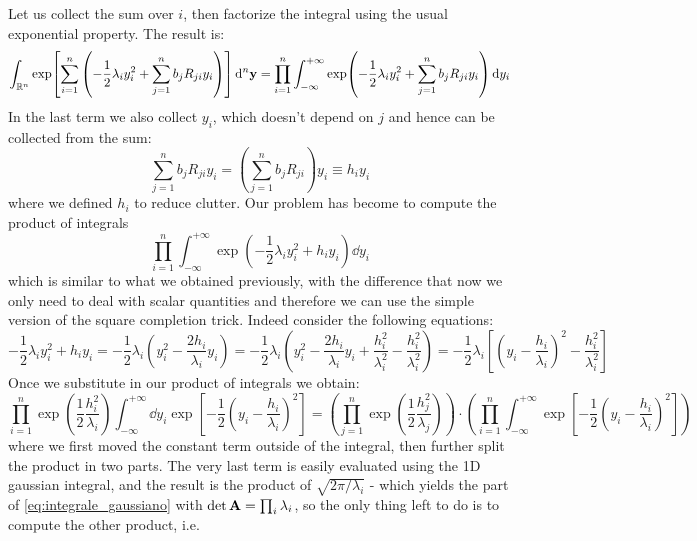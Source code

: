 \documentclass[a4paper]{article}
\newcommand{\R}{\mathbb{R}}
\newcommand{\mat}[1]{\vb{#1}}
\begin{document}
Let us collect the sum over $i$, then factorize the integral using the usual exponential property. The result is:
\begin{equation*}
    \int_{\R^n}\exp[\sum_{i=1}^n \left(-\frac{1}{2} \lambda_i y_i^2 + \sum_{j=1}^n b_j R_{ji} y_i\right)] \dd[n]{\vb{y}} = 
    \prod_{i=1}^n \int_{-\infty}^{+\infty}\exp(-\frac{1}{2} \lambda_i y_i^2 + \sum_{j=1}^n b_j R_{ji} y_i) \dd{y_i}
\end{equation*}
In the last term we also collect $y_i$, which doesn't depend on $j$ and hence can be collected from the sum:
\begin{equation*}
    \sum_{j=1}^n b_j R_{ji} y_i = \left(\sum_{j=1}^n b_j R_{ji}\right) y_i \equiv h_i y_i
\end{equation*}
where we defined $h_i$ to reduce clutter.
Our problem has become to compute the product of integrals
\begin{equation*}
    \prod_{i=1}^n \int_{-\infty}^{+\infty}\exp(-\frac{1}{2} \lambda_i y_i^2 + h_i y_i) \dd{y_i}
\end{equation*}
which is similar to what we obtained previously, with the difference that now we only need to deal with scalar quantities and therefore we can use the simple version of the square completion trick. Indeed consider the following equations:
\begin{equation*}
    -\frac{1}{2} \lambda_i y_i^2 + h_i y_i = -\frac{1}{2} \lambda_i \left( y_i^2 - \frac{2 h_i}{\lambda_i} y_i\right) = -\frac{1}{2} \lambda_i \left( y_i^2 - \frac{2 h_i}{\lambda_i} y_i + \frac{h_i^2}{\lambda_i^2} - \frac{h_i^2}{\lambda_i^2} \right) = -\frac{1}{2}\lambda_i \left[\left(y_i - \frac{h_i}{\lambda_i}\right)^2 - \frac{h_i^2}{\lambda_i^2} \right]
\end{equation*}
Once we substitute in our product of integrals we obtain:
\begin{equation*}
    \prod_{i=1}^n \exp(\frac{1}{2}\frac{h_i^2}{\lambda_i}) \int_{-\infty}^{+\infty} \dd{y_i} \exp[-\frac{1}{2}\left(y_i - \frac{h_i}{\lambda_i}\right)^2] = \left(\prod_{j=1}^n \exp(\frac{1}{2}\frac{h_j^2}{\lambda_j})\right) \cdot \left(\prod_{i=1}^n \int_{-\infty}^{+\infty} \exp[-\frac{1}{2}\left(y_i - \frac{h_i}{\lambda_i}\right)^2]\right)
\end{equation*}
where we first moved the constant term outside of the integral, then further split the product in two parts. The very last term is easily evaluated using the 1D gaussian integral, and the result is the product of $\sqrt{2\pi/\lambda_i}$ - which yields the part of \eqref{eq:integrale_gaussiano} with $\det\mat{A}=\prod_i \lambda_i$, so the only thing left to do is to compute the other product, i.e.
\end{document}
